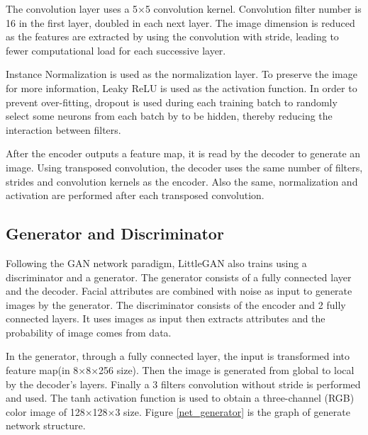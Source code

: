 The convolution layer uses a 5×5 convolution kernel.
Convolution filter number is 16 in the first layer, doubled in each next layer.
The image dimension is reduced as the features are extracted by using the convolution with stride, leading to fewer computational load for each successive layer. 

Instance Normalization is used as the normalization layer.
To preserve the image for more information, Leaky ReLU is used as the activation function.
In order to prevent over-fitting,
    dropout is used during each training batch to randomly select some neurons from each batch by to be hidden, thereby reducing the interaction between filters.

After the encoder outputs a feature map, it is read by the decoder to generate an image.
Using transposed convolution, the decoder uses the same number of filters,
    strides and convolution kernels as the encoder.
Also the same, normalization and activation are performed after each transposed convolution.

\subsection{Generator and Discriminator}

Following the GAN network paradigm, LittleGAN also trains using a discriminator and a generator.
The generator consists of a fully connected layer and the decoder.
Facial attributes are combined with noise as input to generate images by the generator.
The discriminator consists of the encoder and 2 fully connected layers.
It uses images as input then extracts attributes and the probability of image comes from data.


In the generator, through a fully connected layer, the input is transformed into feature map(in 8×8×256 size).
Then the image is generated from global to local by the decoder's layers.
Finally a 3 filters convolution without stride is performed and used.
The tanh activation function is used to obtain a three-channel (RGB) color image of 128×128×3 size.
Figure \ref{net_generator} is the graph of generate network structure.

